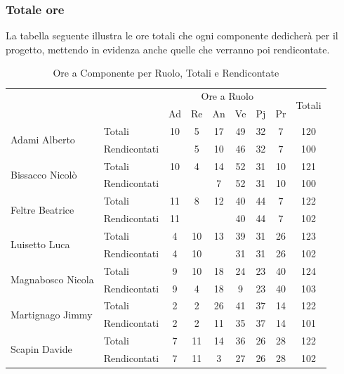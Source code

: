 \subsubsection{Totale ore}
\label{totore}
La tabella seguente illustra le ore totali che ogni componente dedicherà per il progetto, mettendo in evidenza anche quelle che verranno poi rendicontate.
\begin{table}[!h]
\centering
	\begin{tabular}{|l|l|c|c|c|c|c|c|c|}
	\cline{1-9}{\multirow{2}{*}{Nominativi}}& &\multicolumn{6}{c|}{Ore a Ruolo} & \multirow{2}{*}{Totali}\\
	&& Ad & Re & An & Ve & Pj & Pr& \\
	\hline
	\hline
	\multicolumn{1}{|l|}{\multirow{2}{*}{Adami Alberto}} & \multicolumn{1}{|l|}{Totali} & 10 &5&17&49&32&7&120\\
	\cline{2-9}
	&\multicolumn{1}{|l|}{Rendicontati} &&5&10&46&32&7&100\\
	\hline
	\hline
		\multicolumn{1}{|l|}{\multirow{2}{*}{Bissacco Nicolò}} & \multicolumn{1}{|l|}{Totali} & 10 &4&14&52&31&10&121\\
	\cline{2-9}
	&\multicolumn{1}{|l|}{Rendicontati} &&&7&52&31&10&100\\
	\hline
	\hline
		\multicolumn{1}{|l|}{\multirow{2}{*}{Feltre Beatrice}} & \multicolumn{1}{|l|}{Totali} & 11 &8&12&40&44&7&122\\
	\cline{2-9}
	&\multicolumn{1}{|l|}{Rendicontati} &11&&&40&44&7&102\\
	\hline
	\hline
			\multicolumn{1}{|l|}{\multirow{2}{*}{Luisetto Luca}} & \multicolumn{1}{|l|}{Totali} & 4 &10&13&39&31&26&123\\
	\cline{2-9}
	&\multicolumn{1}{|l|}{Rendicontati} &4&10&&31&31&26&102\\
	\hline
	\hline
			\multicolumn{1}{|l|}{\multirow{2}{*}{Magnabosco Nicola}} & \multicolumn{1}{|l|}{Totali} & 9 &10&18&24&23&40&124\\
	\cline{2-9}
	&\multicolumn{1}{|l|}{Rendicontati} &9&4&18&9&23&40&103\\
	\hline
	\hline
			\multicolumn{1}{|l|}{\multirow{2}{*}{Martignago Jimmy}} & \multicolumn{1}{|l|}{Totali} & 2 &2&26&41&37&14&122\\
	\cline{2-9}
	&\multicolumn{1}{|l|}{Rendicontati} &2&2&11&35&37&14&101\\
	\hline
	\hline
			\multicolumn{1}{|l|}{\multirow{2}{*}{Scapin Davide}} & \multicolumn{1}{|l|}{Totali} & 7 &11&14&36&26&28&122\\
	\cline{2-9}
	&\multicolumn{1}{|l|}{Rendicontati} &7&11&3&27&26&28&102\\
	\cline{1-9}
	\cline{1-9}
	\end{tabular}
	\caption{Ore a Componente per Ruolo, Totali e Rendicontate}
	\label{componenteOre}
\end{table}
\pagebreak

